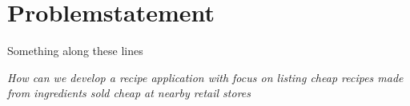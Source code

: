 \section{Problemstatement}
\label{sec:probstate}

Something along these lines

\emph{How can we develop a recipe application with focus on listing cheap recipes made from ingredients sold cheap at nearby retail stores}
